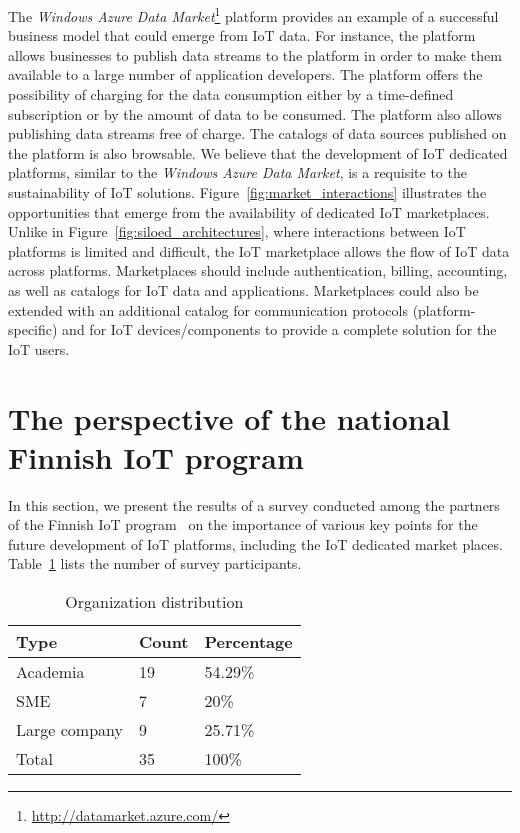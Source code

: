 \documentclass[preprint,10pt,5p]{elsarticle}
\begin{document}
The \emph{Windows Azure Data Market}\footnote{
\url{http://datamarket.azure.com/}} platform provides an example of a successful 
business model that could emerge from IoT data.
For instance, the platform allows businesses to publish data streams to the 
platform in order to make them available to a large number of application 
developers.
The platform offers the possibility of charging for the data consumption either 
by a time-defined subscription or by the amount of data to be consumed. 
The platform also allows publishing data streams free of charge.
The catalogs of data sources published on the platform is also browsable. 
We believe that the development of IoT dedicated platforms, similar to the
\emph{Windows Azure Data Market}, is a requisite to the sustainability of IoT
solutions. 
Figure~\ref{fig:market_interactions} illustrates the opportunities that emerge from the availability of dedicated IoT marketplaces.
Unlike in Figure~\ref{fig:siloed_architectures}, where interactions between IoT platforms is limited and difficult, the IoT marketplace allows the flow of IoT data across platforms.
Marketplaces should include authentication, billing, accounting,
as well as catalogs for IoT data and applications. 
Marketplaces could also be extended with an additional catalog for communication 
protocols (platform-specific) and for IoT devices/components to provide a complete 
solution for the IoT users.

\section{The perspective of the national Finnish IoT program}
\label{sec:survey}

In this section, we present the results of a survey conducted
among the partners of the Finnish IoT program~\cite{Tarkoma2013} 
on the importance of various key points for
the future development of IoT platforms, including the IoT dedicated
market places. Table~\ref{tab:organisations} lists the number of
survey participants.

\begin{table}[h]
  \centering
  \caption{Organization distribution}
  \label{tab:organisations}
  \begin{tabular}{|l|l|l|}
    \hline
    Type & Count & Percentage\\\hline
    Academia & 19 & 54.29\%\\
    SME & 7 & 20\%\\
    Large company & 9 & 25.71\%\\\hline
    Total & 35 & 100\%\\\hline
  \end{tabular}
\end{table}
\end{document}
